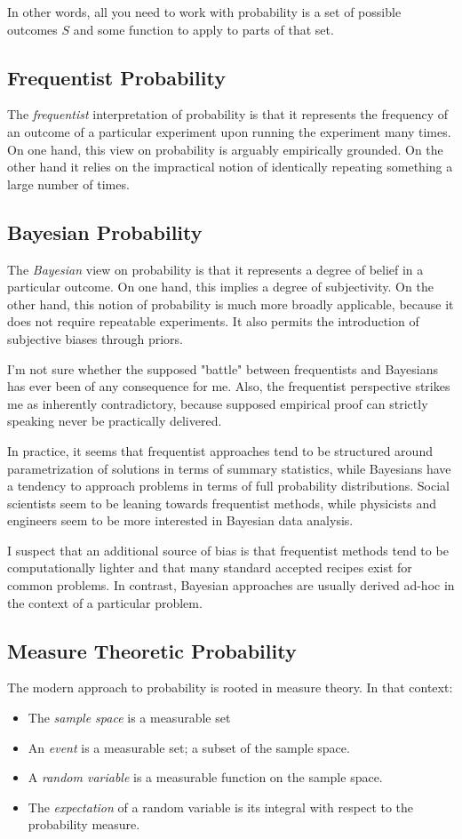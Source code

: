 In other words, all you need to work with probability is a set of possible outcomes $S$ and some function to apply to parts of that set.

\subsection{Frequentist Probability}
The \textit{frequentist} interpretation of probability is that it represents the frequency of an outcome of a particular experiment upon running the experiment many times. On one hand, this view on probability is arguably empirically grounded. On the other hand it relies on the impractical notion of identically repeating something a large number of times. 

\subsection{Bayesian Probability}
The \textit{Bayesian} view on probability is that it represents a degree of belief in a particular outcome. On one hand, this implies a degree of subjectivity. On the other hand, this notion of probability is much more broadly applicable, because it does not require repeatable experiments. It also permits the introduction of subjective biases through priors.

I'm not sure whether the supposed "battle" between frequentists and Bayesians has ever been of any consequence for me. Also, the frequentist perspective strikes me as inherently contradictory, because supposed empirical proof can strictly speaking never be practically delivered.

In practice, it seems that frequentist approaches tend to be structured around parametrization of solutions in terms of summary statistics, while Bayesians have a tendency to approach problems in terms of full probability distributions. Social scientists seem to be leaning towards frequentist methods, while physicists and engineers seem to be more interested in Bayesian data analysis. 

I suspect that an additional source of bias is that frequentist methods tend to be computationally lighter and that many standard accepted recipes exist for common problems. In contrast, Bayesian approaches are usually derived ad-hoc in the context of a particular problem.

\subsection{Measure Theoretic Probability}
The modern approach to probability is rooted in measure theory. In that context:

\begin{itemize}
\item The \textit{sample space} is a measurable set
\item An \textit{event} is a measurable set; a subset of the sample space.
\item A \textit{random variable} is a measurable function on the sample space.
\item The \textit{expectation} of a random variable is its integral with respect to the probability measure.
\end{itemize}


